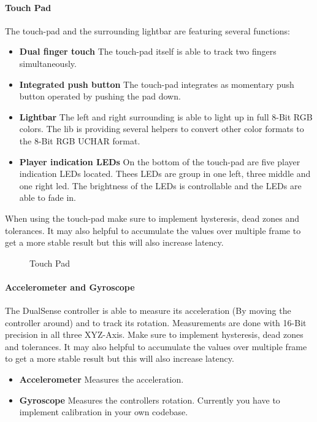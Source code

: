 \paragraph{Touch Pad}
The touch-pad and the surrounding lightbar are featuring several functions:
\begin{itemize}
	\item \textbf{Dual finger touch} The touch-pad itself is able to track two fingers simultaneously.
	\item \textbf{Integrated push button} The touch-pad integrates as momentary push button operated by pushing the pad down.
	\item \textbf{Lightbar} The left and right surrounding is able to light up in full 8-Bit RGB colors. The lib is providing several helpers to convert other color formats to the 8-Bit RGB UCHAR format.
	\item \textbf{Player indication LEDs} On the bottom of the touch-pad are five player indication LEDs located. Thees LEDs are group in one left, three middle and one right led. The brightness of the LEDs is controllable and the LEDs are able to fade in.
\end{itemize}
When using the touch-pad make sure to implement hysteresis, dead zones and tolerances. It may also helpful to accumulate the values over multiple frame to get a more stable result but this will also increase latency. 
\begin{figure}[H]
    \centering
    \caption{Touch Pad}
\end{figure}

\paragraph{Accelerometer and Gyroscope}
The DualSense controller is able to measure its acceleration (By moving the controller around) and to track its rotation. Measurements are done with 16-Bit precision in all three XYZ-Axis. Make sure to implement hysteresis, dead zones and tolerances. It may also helpful to accumulate the values over multiple frame to get a more stable result but this will also increase latency.
\begin{itemize}
	\item \textbf{Accelerometer} Measures the acceleration.
	\item \textbf{Gyroscope} Measures the controllers rotation. Currently you have to implement calibration in your own codebase. 
\end{itemize}

